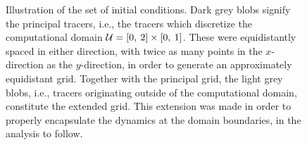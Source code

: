 \begin{figure}[htpb]
    \centering
    \def\svgwidth{0.8\linewidth}{}
    \caption[Illustration of the set of initial conditions]
        {Illustration of the set of initial conditions.
                Dark grey blobs signify the principal tracers, i.e., the tracers
                which discretize the computational domain
                $\mathcal{U}=[0,\hspace{0.5ex}2]\times[0,\hspace{0.5ex}1]$. These were equidistantly
        spaced in either direction, with twice as many points in the $x$-
        direction as the $y$-direction, in order to generate an approximately
        equidistant grid. Together with the principal grid, the light grey
        blobs, i.e., tracers originating outside of the computational domain,
        constitute the extended grid. This extension was made in order to
        properly encapsulate the dynamics at the domain boundaries, in the
    analysis to follow.}
    \label{fig:initialgrid}
\end{figure}
